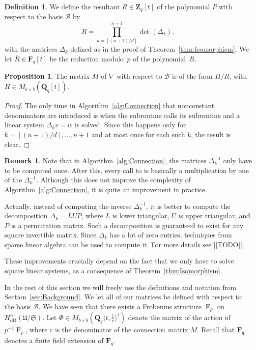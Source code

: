 \documentclass[a4paper,11pt]{article}
\numberwithin{equation}{section}
\providecommand{\ceil}[1]{\left\lceil#1\right\rceil}   %
\newcommand{\ZZ}{\mathbf{Z}} %
\newcommand{\QQ}{\mathbf{Q}} %
\newcommand{\FF}{\mathbf{F}} %
\DeclareMathOperator{\Frob}{F}           %
\providecommand{\HdR}{H_{\text{dR}}}    %
\providecommand{\cB}{\mathcal{B}} %
\theoremstyle{definition}
\newtheorem{prop}[thm]{Proposition}
\newtheorem{defn}[thm]{Definition}
\newtheorem{rem}[thm]{Remark}
\begin{document}
\begin{defn} \label{defn:resultant}
We define the resultant $R \in \ZZ_q[t]$ of the polynomial $P$ with respect to the
basis $\cB$ by
\[
R = \prod_{k=\ceil{(n+1)/d}}^{n+1}  \det(\Delta_k),
\]
with the matrices $\Delta_k$ defined as in the proof of Theorem~\ref{thm:Isomorphism}. 
We let $\overline{R} \in \FF_q[t]$ be the reduction modulo~$p$ of the polynomial~$R$.
\end{defn}

\begin{prop} \label{thm:denom}
The matrix $M$ of $\nabla$ with respect to $\cB$ is of the form
$H/R$, with $H \in M_{b \times b}(\QQ_q[t])$.
\end{prop}

\begin{proof}
The only time in Algorithm~\ref{alg:Connection} that nonconstant denominators are introduced is when the subroutine {} 
calls its subroutine {} and a linear system $\Delta_k v = w$ is solved. Since this happens only for 
$k=\ceil{(n+1)/d}, \dotsc, n+1$ and at most once for each such $k$, the result is clear.
\end{proof}

\begin{rem} Note that in Algorithm~\ref{alg:Connection}, the matrices $\Delta_k^{-1}$ only have to be computed
once. After this, every call to {} is basically a multiplication by one of the $\Delta_k^{-1}$.
Although this does not improve the complexity of Algorithm~\ref{alg:Connection}, it is quite an improvement 
in practice. 

Actually, instead of computing the inverse $\Delta_k^{-1}$, it is better to compute the 
decomposition $\Delta_k = L U P$, where $L$ is lower triangular, $U$ is upper triangular, and
$P$ is a permutation matrix. Such a decomposition is guaranteed to exist for any square invertible
matrix. Since $\Delta_k$ has a lot of zero entries, techniques from sparse linear algebra can be 
used to compute it. For more details see [[TODO]].

These improvements crucially depend on the fact that we only have to solve square linear
systems, as a consequence of Theorem~\ref{thm:Isomorphism}.
\end{rem}

In the rest of this section we will freely use the definitions and notation from Section~\ref{sec:Background}. 
We let all of our matrices be defined with respect to the basis $\cB$. We have seen that 
there exists a Frobenius structure $\Frob_p$ on $\HdR^n(\mathfrak{U}/\mathfrak{S})$. Let 
$\Phi \in M_{b \times b}(\QQ_q \langle t, \frac{1}{r} \rangle^{\dag})$ denote the 
matrix of the action of $p^{-1}\Frob_p$, where $r$ is the denominator of the connection 
matrix $M$. Recall that $\FF_{\mathfrak{q}}$ denotes a finite field extension of $\FF_q$. 
\end{document}
